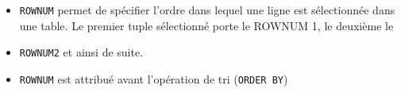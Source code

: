 \documentclass[10pt]{beamer}
\begin{document}
\begin{frame}[allowframebreaks]{\secname}
    
\end{frame}

\begin{frame}{\secname}
    \begin{itemize}
        \item \lstinline[language=plsql]!ROWNUM! permet de spécifier l'ordre dans lequel une ligne est sélectionnée dans une table.  Le premier tuple sélectionné porte le ROWNUM 1, le deuxième le
        \item \lstinline[language=plsql]!ROWNUM2! et ainsi de suite.
        \item \lstinline[language=plsql]!ROWNUM! est attribué avant l'opération de tri (\lstinline[language=plsql]!ORDER BY!)
    \end{itemize}
\end{frame}

\begin{frame}{\secname}
    
\end{frame}

\begin{frame}{\secname}
    
\end{frame}


\end{document}
